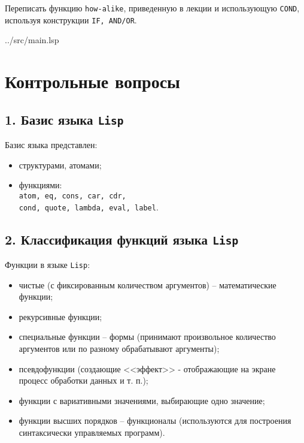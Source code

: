 Переписать функцию {\texttt{how-alike}}, приведенную
в лекции и использующую {\texttt{COND}}, используя конструкции {\texttt{IF, AND/OR}}.

\begin{lstinputlisting}[
	caption={Задание 9},
	label={lst:t9},
	style={lsp},
	linerange={55-81},
	]{../src/main.lsp}
\end{lstinputlisting}

\clearpage
\section*{Контрольные вопросы}

\subsection*{1. Базис языка {\texttt{Lisp}}}

Базис языка представлен:
\begin{itemize}
	\item структурами, атомами;
	\item функциями:\\
	{\texttt{atom, eq, cons, car, cdr,}}\\
	{\texttt{cond, quote, lambda, eval, label}}.
\end{itemize}

\subsection*{2. Классификация функций языка {\texttt{Lisp}}}

Функции в языке {\texttt{Lisp}}:
\begin{itemize}
	\item чистые (с фиксированным количеством аргументов) -- математические функции;
	\item рекурсивные функции;
	\item специальные функции -- формы (принимают произвольное количество аргументов или по разному обрабатывают аргументы);
	\item псевдофункции (создающие <<эффект>> - отображающие на экране процесс обработки данных и т. п.);
	\item функции с вариативными значениями, выбирающие одно значение;
	\item функции высших порядков -- функционалы (используются для построения синтаксически управляемых программ).
\end{itemize}

